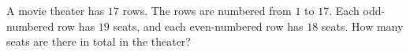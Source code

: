 A movie theater has $17$ rows. The rows are numbered from $1$ to $17$. Each odd-numbered row has $19$ seats, and each even-numbered row has $18$ seats. How many seats are there in total in the theater?
